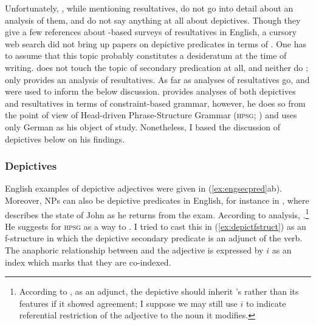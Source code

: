 Unfortunately, \citet[347]{bresnan2016}, while mentioning resultatives, do not
go into detail about an \Lfg{} analysis of them, and do not say anything at all
about depictives. Though they give a few references about \Lfg{}-based surveys
of resultatives in English, a cursory web search did not bring up papers on
depictive predicates in terms of \Lfg{}. One has to assume that this topic
probably constitutes a desideratum at the time of writing.
\citet{dalrymple2001} does not touch the topic of secondary predication at all,
and neither do \citet{butt1999}; \citet{falk2001} only provides an analysis of
resultatives. As far as \Lfg{} analyses of resultatives go, \citet{simpson1983}
and \citet{christie2013} were used to inform the below discussion.
\textcites{mueller2002} provides analyses of both depictives and resultatives
in terms of constraint-based grammar, however, he does so from the point of
view of Head-driven Phrase-Structure Grammar (\textsc{hpsg};
\cite{pollardsag1994}) and uses only German as his object of study.
Nonetheless, I based the discussion of depictives below on his findings.

\subsubsection{Depictives}
\label{subsubsec:depict}

English examples of depictive adjectives were given in (\ref{ex:engsecpred}ab).
Moreover, NPs can also be depictive predicates in English, for instance in 
, where 
describes the state of John as he returns from the exam. According to
 analysis, .\footnote{According to
\citet{wechslerzlatic2003}, as an adjunct, the depictive should inherit
's \Concord{} rather than its \Index{} features if it showed agreement;
I suppose we may still use $i$ to indicate referential restriction of the
adjective to the noun it modifies.} He suggests for \textsc{hpsg}  as a way to
. I tried to cast
this in (\ref{ex:depictfstruct}) as an f-structure in which the depictive
secondary predicate is an adjunct of the
verb. The anaphoric relationship between \Subj{} and the adjective is expressed
by $i$ as an index which marks that they are co-indexed.

